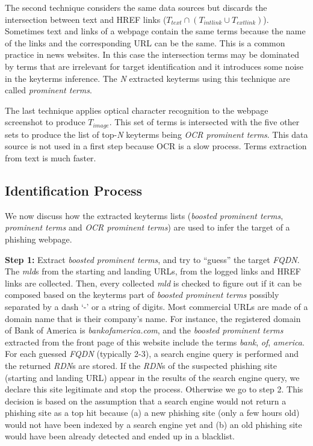 \documentclass[10pt,conference,compsocconf,letterpaper]{IEEEtran}
\begin{document}
The second technique considers the same data sources but discards the intersection between text and HREF links ($T_{text}  \cap (T_{intlink} \cup T_{extlink})$).
Sometimes text and links of a webpage contain the same terms because the name of the links and the corresponding URL can be the same. This is a common practice in news websites. In this case the intersection terms may be dominated by terms that are irrelevant for target identification and it introduces some noise in the keyterms inference.
The \textit{N} extracted keyterms using this technique are called \textit{prominent terms}.

The last technique applies optical character recognition to the webpage screenshot to produce $T_{image}$. This set of terms is intersected with the five other sets to produce the list of top-\textit{N} keyterms being \textit{OCR prominent terms}. This data source is not used in a first step because OCR is a slow process. Terms extraction from text is much faster. 


\subsection{Identification Process}
\label{subsec:identification}

We now discuss how the extracted keyterms lists (\textit{boosted prominent terms}, \textit{prominent terms} and \textit{OCR prominent terms}) are used to infer the target of a phishing webpage. 


\noindent\textbf{Step 1:}
Extract \textit{boosted prominent terms}, and try to ``guess'' the target \textit{FQDN}. The \textit{mld}s from the starting and landing URLs, from the logged links and HREF links are collected. Then, every collected \textit{mld} is checked to figure out if it can be composed based on the keyterms part of \textit{boosted prominent terms} possibly separated by a dash `-' or a string of digits.
\iffullversion
Most commercial URLs are made of a domain name that is their company's name. For instance, the registered domain of Bank of America is \textit{bankofamerica.com}, and the \textit{boosted prominent terms} extracted from the front page of this website include the terms \textit{bank}, \textit{of}, \textit{america}.
\fi
For each guessed \textit{FQDN} (typically 2-3), a search engine query is performed and the returned \textit{RDN}s are stored.
If the \textit{RDN}s of the suspected phishing site (starting and landing URL) appear in the results of the search engine query, we declare this site legitimate and stop the process. Otherwise we go to step 2.
This decision is based on the assumption that a search engine would not return a phishing site as a top hit because (a) a new phishing site (only a few hours old) would not have been indexed by a search engine yet and (b) an old phishing site would have been already detected and ended up in a blacklist.  
\end{document}
